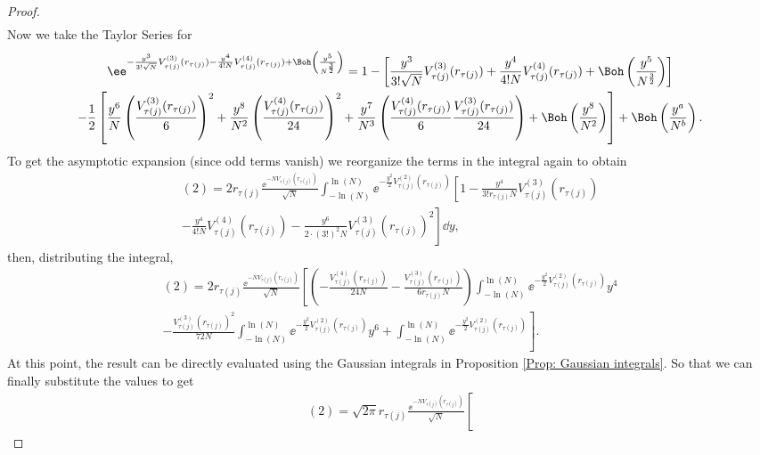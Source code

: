 \begin{proof}
\begin{align}
	\end{align}
	Now we take the Taylor Series for 
	\begin{multline}
		\ee^{- \frac{y^3}{3! \sqrt{N}} V^{(3)}_{\tau(j)}(r_{\tau(j)}) - \frac{y^4}{4! N} V^{(4)}_{\tau(j)}(r_{\tau(j)}) + \Boh\left(\frac{y^5}{N^\frac{3}{2}}\right)} = 1 - \left[ \frac{y^3}{3! \sqrt{N}} V^{(3)}_{\tau(j)}(r_{\tau(j)}) + \frac{y^4}{4! N} V^{(4)}_{\tau(j)}(r_{\tau(j)}) + \Boh\left(\frac{y^5}{N^\frac{3}{2}}\right) \right] \\ 
		- \frac{1}{2} \left[ \frac{y^6}{N} \left(\frac{V^{(3)}_{\tau(j)}(r_{\tau(j)})}{6} \right)^2 + \frac{y^8}{N^2} \left(\frac{V^{(4)}_{\tau(j)}(r_{\tau(j)})}{24} \right)^2 + \frac{y^7}{N^3} \left(\frac{V^{(4)}_{\tau(j)}(r_{\tau(j)})}{6} \frac{V^{(3)}_{\tau(j)}(r_{\tau(j)})}{24} \right) + \Boh\left(\frac{y^8}{N^2}\right)  \right] + \Boh\left(\frac{y^a}{N^b}\right).
	\end{multline}
	To get the asymptotic expansion (since odd terms vanish) we reorganize the terms in the integral again to obtain
	\begin{multline}
		(2) = 2 r_{\tau(j)} \frac{\ee^{-N V_{\tau(j)}(r_{\tau(j)})}}{\sqrt{N}}  \int_{-\ln(N)}^{\ln(N)} \ee^{-\frac{y^2}{2} V^{(2)}_{\tau(j)}(r_{\tau(j)})} \left[ 1 - \frac{y^4}{3! r_{\tau(j)} N} V^{(3)}_{\tau(j)}(r_{\tau(j)}) \right. \\
		\left. - \frac{y^4}{4! N} V^{(4)}_{\tau(j)}(r_{\tau(j)}) - \frac{y^6}{2 \cdot (3!)^2 N} V^{(3)}_{\tau(j)}(r_{\tau(j)})^2 \right] \dd y,
		\label{Equation: value-contributing integral}
	\end{multline}
	then, distributing the integral,
	\begin{multline}
		(2) = 2 r_{\tau(j)} \frac{\ee^{-N V_{\tau(j)}(r_{\tau(j)})}}{\sqrt{N}}
		 \left[
		\left(- \frac{V^{(4)}_{\tau(j)}(r_{\tau(j)})}{24 N} - \frac{V^{(3)}_{\tau(j)}(r_{\tau(j)})}{6 r_{\tau(j)} N} \right)
		\int_{-\ln(N)}^{\ln(N)} \ee^{-\frac{y^2}{2} V^{(2)}_{\tau(j)}(r_{\tau(j)})} y^4 \right. \\
		\left. - \frac{V^{(3)}_{\tau(j)}(r_{\tau(j)})^2}{72 N}
		\int_{-\ln(N)}^{\ln(N)} \ee^{-\frac{y^2}{2} V^{(2)}_{\tau(j)}(r_{\tau(j)})} y^6 +
		\int_{-\ln(N)}^{\ln(N)} \ee^{-\frac{y^2}{2} V^{(2)}_{\tau(j)}(r_{\tau(j)})} \right].
	\end{multline}
	At this point, the result can be directly evaluated using the Gaussian integrals in Proposition \ref{Prop: Gaussian integrals}.	So that we can finally substitute the values to get
	\begin{multline}
		(2) = \sqrt{2\pi} r_{\tau(j)} \frac{\ee^{-N V_{\tau(j)}(r_{\tau(j)})}}{\sqrt{N}} \left[

\end{multline}
\end{proof}
